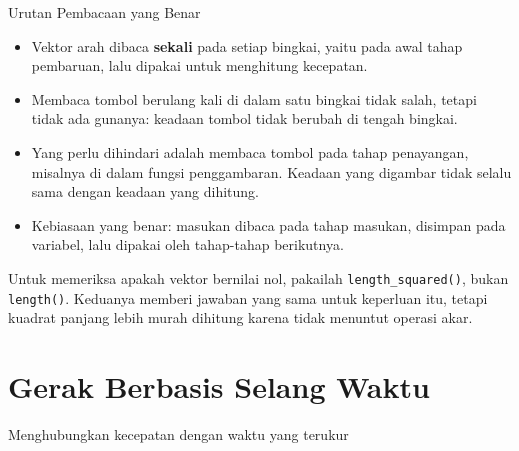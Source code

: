 \documentclass[aspectratio=169,10pt]{beamer}
\begin{document}
\begin{frame}{Urutan Pembacaan yang Benar}
\begin{itemize}
  \item Vektor arah dibaca \textbf{sekali} pada setiap bingkai, yaitu pada awal
        tahap pembaruan, lalu dipakai untuk menghitung kecepatan.
  \item Membaca tombol berulang kali di dalam satu bingkai tidak salah, tetapi
        tidak ada gunanya: keadaan tombol tidak berubah di tengah bingkai.
  \item Yang perlu dihindari adalah membaca tombol pada tahap penayangan,
        misalnya di dalam fungsi penggambaran. Keadaan yang digambar tidak
        selalu sama dengan keadaan yang dihitung.
  \item Kebiasaan yang benar: masukan dibaca pada tahap masukan, disimpan pada
        variabel, lalu dipakai oleh tahap-tahap berikutnya.
\end{itemize}
\vspace{0.16cm}
\begin{kiat}
Untuk memeriksa apakah vektor bernilai nol, pakailah
\texttt{length\_squared()}, bukan \texttt{length()}. Keduanya memberi jawaban
yang sama untuk keperluan itu, tetapi kuadrat panjang lebih murah dihitung
karena tidak menuntut operasi akar.
\end{kiat}
\end{frame}

\section{Gerak Berbasis Selang Waktu}
  {Menghubungkan kecepatan dengan waktu yang terukur}
\end{document}
